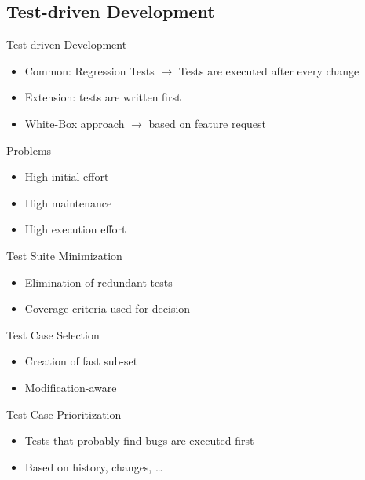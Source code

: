 \subsection{Test-driven Development}
\begin{frame}{\insertsubsection}
	\begin{fancycolumns}[animation=none]
		\begin{definition}{Test-driven Development}
			\begin{itemize}
				\item Common: Regression Tests $\rightarrow$ Tests are executed after every change
				\item Extension: tests are written first
				\item White-Box approach $\rightarrow$ based on feature request
			\end{itemize}
		\end{definition} \pause
		\begin{note}{Problems}
			\begin{itemize}
				\item High initial effort
				\item High maintenance
				\item High execution effort
			\end{itemize}
		\end{note} \pause
		\nextcolumn
		\begin{note}{Test Suite Minimization}
			\begin{itemize}
				\item Elimination of redundant tests
				\item Coverage criteria used for decision
			\end{itemize}
		\end{note} \pause
		\begin{note}{Test Case Selection}
			\begin{itemize}
				\item Creation of fast sub-set 
				\item Modification-aware
			\end{itemize}
		\end{note} \pause
		\begin{note}{Test Case Prioritization}
			\begin{itemize}
				\item Tests that probably find bugs are executed first
				\item Based on history, changes, \dots
			\end{itemize}
		\end{note} 
	\end{fancycolumns}
\end{frame}

